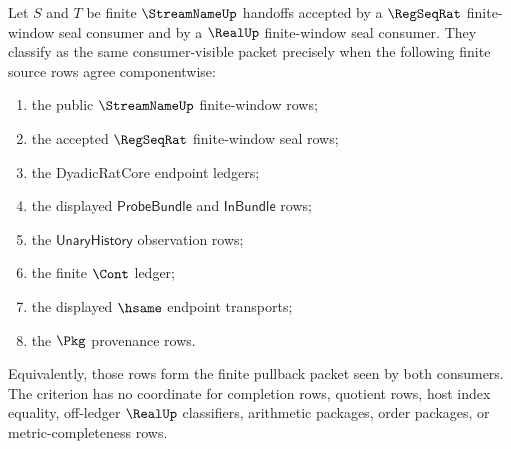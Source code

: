 \begin{theorem}
\label{thm:streamname-regseqrat-realup-finite-window-pullback-criterion}
Let $S$ and $T$ be finite $\StreamNameUp$ handoffs accepted by a
$\RegSeqRat$ finite-window seal consumer and by a $\RealUp$ finite-window
seal consumer. They classify as the same consumer-visible packet precisely
when the following finite source rows agree componentwise:
\begin{enumerate}
\item the public $\StreamNameUp$ finite-window rows;
\item the accepted $\RegSeqRat$ finite-window seal rows;
\item the DyadicRatCore endpoint ledgers;
\item the displayed $\mathsf{ProbeBundle}$ and $\mathsf{InBundle}$ rows;
\item the $\mathsf{UnaryHistory}$ observation rows;
\item the finite $\Cont$ ledger;
\item the displayed $\hsame$ endpoint transports;
\item the $\Pkg$ provenance rows.
\end{enumerate}
Equivalently, those rows form the finite pullback packet seen by both
consumers. The criterion has no coordinate for completion rows, quotient rows,
host index equality, off-ledger $\RealUp$ classifiers, arithmetic packages,
order packages, or metric-completeness rows.
\end{theorem}
